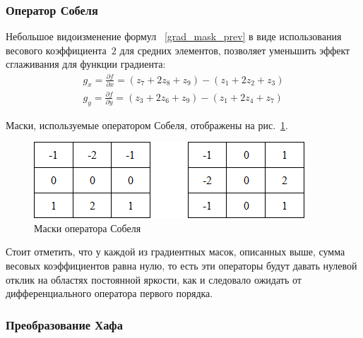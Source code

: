 \documentclass[12pt]{article} %
\begin{document}
\subsubsection{Оператор Собеля}

Небольшое видоизменение формул ~\ref{grad_mask_prev} в виде использования весового коэффициента~$2$ для средних элементов, позволяет уменьшить эффект сглаживания для функции градиента:
\begin{gather}\label{grad_mask_sob}
	g_x = \frac{\partial f}{\partial x} = (z_7+2z_8+z_9)-(z_1+2z_2+z_3)\\
	g_y = \frac{\partial f}{\partial y} = (z_3+2z_6+z_9)-(z_1+2z_4+z_7)
\end{gather}

\newpage

Маски, используемые оператором Собеля, отображены на рис.~\ref{fig:grad_mask_sob}.

\begin{figure}[h]
	
	\centering
	
	\includegraphics[width=0.4\linewidth]{grad_mask_sob.jpg}
	
	\caption{Маски оператора Собеля}
	
	\label{fig:grad_mask_sob}
	
\end{figure}

Стоит отметить, что у каждой из градиентных масок, описанных выше, сумма весовых коэффициентов равна нулю, то есть эти операторы будут давать нулевой отклик на областях постоянной яркости, как и следовало ожидать от дифференциального оператора первого порядка.

\subsubsection{Преобразование Хафа}
\end{document}
